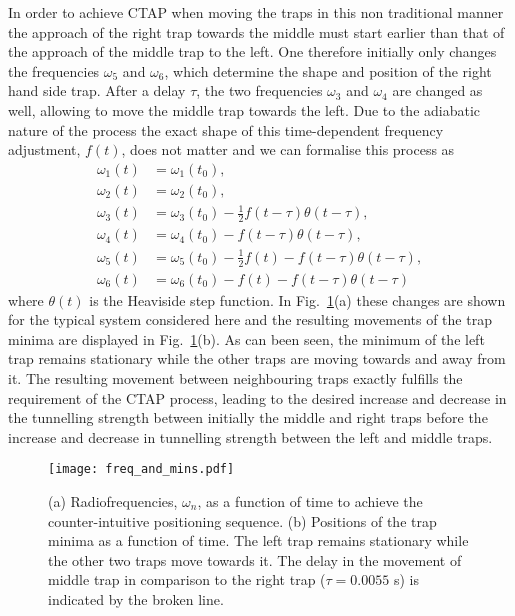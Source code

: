 In order to achieve CTAP when moving the traps in this non traditional
manner the approach of the right trap towards the middle must start
earlier than that of the approach of the middle trap to the left. One
therefore initially only changes the frequencies $\omega_5$ and
$\omega_6$, which determine the shape and position of the right hand
side trap. After a delay $\tau$, the two frequencies $\omega_3$ and
$\omega_4$ are changed as well, allowing to move the middle trap
towards the left. Due to the adiabatic nature of the process the exact
shape of this time-dependent frequency adjustment, $f(t)$, does not
matter and we can formalise this process as
\begin{subequations}
  \begin{align}
    \omega_1(t)&=\omega_1(t_0),\\
    \omega_2(t)&=\omega_2(t_0),\\
    \omega_3(t)&=\omega_3(t_0)-\frac{1}{2}f(t-\tau)\theta(t-\tau),\\
    \omega_4(t)&=\omega_4(t_0)-f(t-\tau)\theta(t-\tau),\\ 
    \omega_5(t)&=\omega_5(t_0)-\frac{1}{2}f(t)-f(t-\tau)\theta(t-\tau),\\ 
    \omega_6(t)&=\omega_6(t_0)-f(t) - f(t-\tau)\theta(t-\tau)\,
  \end{align}
\label{eq:RFAdjustmentLinear}
\end{subequations}
where $\theta(t)$ is the Heaviside step function. In
Fig.~\ref{fig:FreqAndMins}(a) these changes are shown for the typical
system considered here and the resulting movements of the trap minima
are displayed in Fig.~\ref{fig:FreqAndMins}(b). As can been seen, the
minimum of the left trap remains stationary while the other traps are
moving towards and away from it. The resulting movement between
neighbouring traps exactly fulfills the requirement of the CTAP
process, leading to the desired increase and decrease in the tunnelling strength
between initially the middle and right traps before the increase and decrease in
tunnelling strength between the left and middle traps.
\begin{figure}[tb]
  \texttt{[image: freq\_and\_mins.pdf]}
  \caption{(a) Radiofrequencies, $\omega_n$, as a function of time to
    achieve the counter-intuitive positioning sequence. (b) Positions
    of the trap minima as a function of time. The left trap remains
    stationary while the other two traps move towards it. The delay in
    the movement of middle trap in comparison to the right trap
    ($\tau=0.0055$ s) is indicated by the broken line.}
\label{fig:FreqAndMins}
\end{figure}

